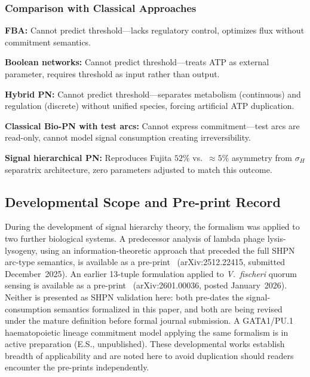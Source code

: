 \documentclass[10pt,letterpaper]{article}
\begin{document}
\subsubsection{Comparison with Classical Approaches}

\textbf{FBA:} Cannot predict threshold---lacks regulatory control, optimizes flux without commitment semantics.

\textbf{Boolean networks:} Cannot predict threshold---treats ATP as external parameter, requires threshold as input rather than output.

\textbf{Hybrid PN:} Cannot predict threshold---separates metabolism (continuous) and regulation (discrete) without unified species, forcing artificial ATP duplication.

\textbf{Classical Bio-PN with test arcs:} Cannot express commitment---test arcs are read-only, cannot model signal consumption creating irreversibility.

\textbf{Signal hierarchical PN:} Reproduces Fujita $52\%$ vs.\ $\approx 5\%$ asymmetry from $\sigma_H$ separatrix architecture, zero parameters adjusted to match this outcome.

\subsection{Developmental Scope and Pre-print Record}
\label{sec:broader}

During the development of signal hierarchy theory, the formalism was applied to
two further biological systems. A predecessor analysis of lambda phage
lysis-lysogeny, using an information-theoretic approach that preceded the full
SHPN arc-type semantics, is available as a pre-print~\cite{simao2024hierarchical}
(arXiv:2512.22415, submitted December~2025). An earlier 13-tuple formulation
applied to \textit{V.\ fischeri} quorum sensing is available as a
pre-print~\cite{simao2025unifying} (arXiv:2601.00036, posted January~2026).
Neither is presented as SHPN validation here: both pre-dates the
signal-consumption semantics formalized in this paper, and both are being revised
under the mature definition before formal journal submission. A GATA1/PU.1
haematopoietic lineage commitment model applying the same formalism is in active
preparation (E.S., unpublished). These developmental works establish breadth of
applicability and are noted here to avoid duplication should readers encounter
the pre-prints independently.
\end{document}
